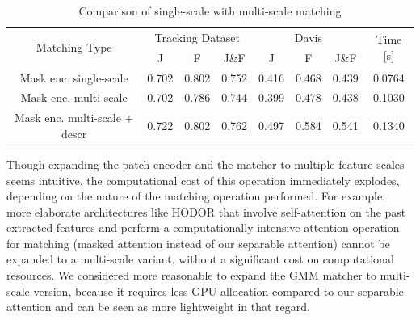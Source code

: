 \begin{table}[ht!]
\caption{Comparison of single-scale with multi-scale matching}
\centering
\label{tab:multires}
\begin{tabular}{|c|ccc|ccc|c|}
\hline
\multicolumn{1}{|c|}{\multirow{2}{*}{Matching Type}} & \multicolumn{3}{c|}{Tracking Dataset}                                              & \multicolumn{3}{c|}{Davis} &\multicolumn{1}{c|}{\multirow{2}{*}{Time [s]}}                                                         \\ \cline{2-7} 
\multicolumn{1}{|c|}{}                              & \multicolumn{1}{c|}{J} & \multicolumn{1}{c|}{F} & \multicolumn{1}{c|}{J\&F}  & \multicolumn{1}{c|}{J} & \multicolumn{1}{c|}{F} & \multicolumn{1}{c|}{J\&F}  & \multicolumn{1}{c|}{}                               \\ \hline

Mask enc. single-scale &   0.702 &  0.802 & 0.752  &  0.416  & 0.468  &  0.439 & 0.0764  \\ 
Mask enc. multi-scale &  0.702 &  0.786 & 0.744  & 0.399 & 0.478 & 0.438 & 0.1030 \\ %

Mask enc. multi-scale + descr   &  0.722 &   0.802 & 0.762  & 0.497  & 0.584 & 0.541 & 0.1340\\ \hline

\end{tabular}
\end{table}
Though expanding the patch encoder and the matcher to multiple feature scales seems intuitive, the computational cost of this operation immediately explodes, depending on the nature of the matching operation performed.
For example, more elaborate architectures like HODOR \parencite{athar2022hodor} that involve self-attention on the past extracted features and perform a computationally intensive attention operation for matching (masked attention instead of our separable attention) cannot be expanded to a multi-scale variant, without a significant cost on computational resources. We considered more reasonable to expand the GMM matcher to multi-scale version, because it requires less GPU allocation compared to our separable attention and can be seen as more lightweight in that regard. \par

